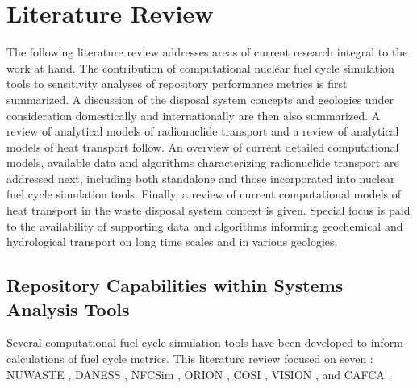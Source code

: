 \chapter{Literature Review}
\label{ch:litrev}

The following literature review addresses areas of current research
integral to the work at hand. The contribution of computational nuclear fuel
cycle simulation tools to sensitivity analyses of repository performance
metrics is first summarized. A discussion of the disposal system concepts and 
geologies under consideration domestically and internationally are then also 
summarized. A review of analytical models of radionuclide transport
and a review of analytical models of heat transport follow. An overview of 
current detailed computational models, available data and algorithms 
characterizing radionuclide transport are addressed next, including both standalone
and those incorporated into nuclear fuel cycle simulation tools. Finally, a
review of current computational models of heat transport in the waste disposal
system context is given. Special focus is paid to the availability of
supporting data and algorithms informing geochemical and hydrological
transport on long time scales and in various geologies. 

\section{Repository Capabilities within Systems Analysis Tools}
\label{sec:SA_repos}




Several computational fuel cycle simulation tools have been developed to inform 
calculations of fuel cycle metrics. This literature review focused on seven : 
\gls{NUWASTE} \cite{abkowitz_nuclear_2010},
\gls{DANESS} \cite{yacout_daness_2011,van_den_durpel_daness:_2006}, 
\gls{NFCSim} \cite{schneider_nfcsim_2004},
ORION \cite{gregg_orion_2011},
\gls{COSI} \cite{boucher_international_2010},
\gls{VISION} \cite{yacout_vision_2006, wilson_comparing_2011, 
radel_repository_2007, boucher_international_2010}, and
\gls{CAFCA} \cite{guerin_impact_2009}.

